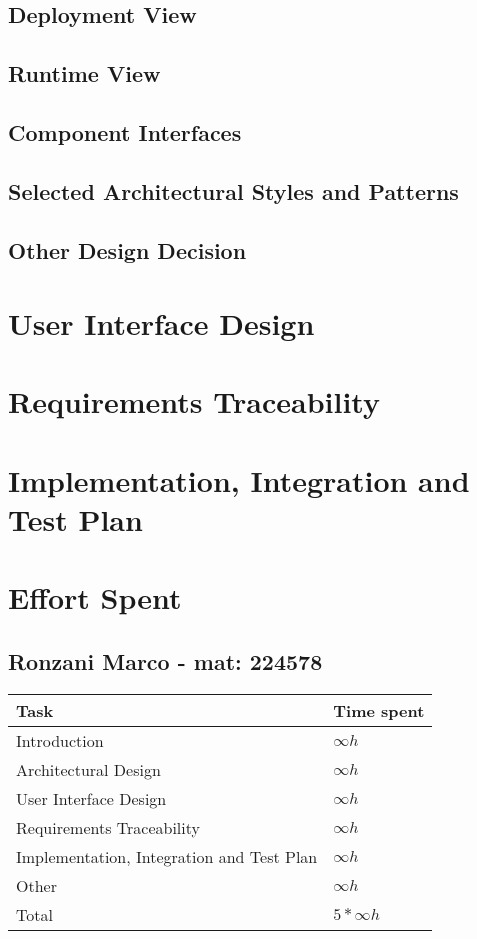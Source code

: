 \documentclass[11pt]{article}
\begin{document}

\subsection{Deployment View}

\subsection{Runtime View}

\subsection{Component Interfaces}

\subsection{Selected Architectural Styles and Patterns}

\subsection{Other Design Decision}

\section{User Interface Design}

\section{Requirements Traceability}

\section{Implementation, Integration and Test Plan}


\section{Effort Spent}

\subsection{Ronzani Marco - mat: 224578}

\begin{tabular}{|l|l|}
    \hline
    \textbf{Task} & \textbf{Time spent} \\
    \hline
    Introduction & $\infty h$ \\
    \hline
    Architectural Design & $\infty h$ \\
    \hline
    User Interface Design & $\infty h$ \\
    \hline
    Requirements Traceability & $\infty h$ \\
    \hline
    Implementation, Integration and Test Plan & $\infty h$ \\
    \hline
    Other & $\infty h$ \\
    \hline
    \hline
    Total & $5*\infty h$ \\
    \hline
\end{tabular}
\end{document}

